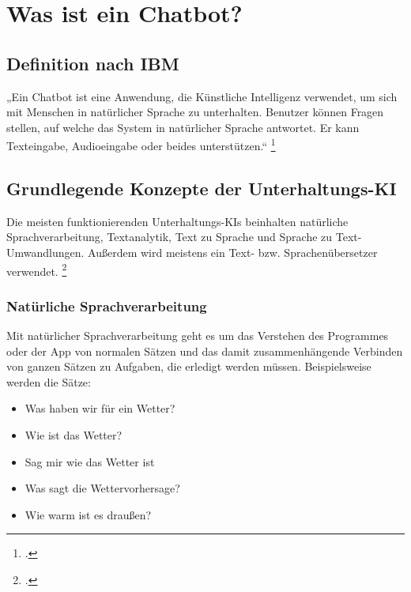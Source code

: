 \chapter{Was ist ein Chatbot?} %
\label{cha:Was ist ein Chatbot?}

\section{Definition nach IBM} %
\label{sec:Definition nach IBM}

„Ein Chatbot ist eine Anwendung, die Künstliche Intelligenz verwendet, um sich mit Menschen in natürlicher Sprache zu unterhalten. Benutzer können Fragen stellen, auf welche das System in natürlicher Sprache antwortet. Er kann Texteingabe, Audioeingabe oder beides unterstützen.“ \footcite[][]{.2021}


\section{Grundlegende Konzepte der Unterhaltungs-KI} %
\label{sec:Grundlegende Konzepte der Unterhaltungs-KI}

Die meisten funktionierenden Unterhaltungs-KIs beinhalten natürliche Sprachverarbeitung, Textanalytik, Text zu Sprache und Sprache zu Text-Umwandlungen. Außerdem wird meistens ein Text- bzw. Sprachenübersetzer verwendet. \footcite[][S. 2]{Bisser.2021}


\subsection{Natürliche Sprachverarbeitung} %
\label{sub:Natürliche Sprachverarbeitung}

Mit natürlicher Sprachverarbeitung geht es um das Verstehen des Programmes oder der App von normalen Sätzen und das damit zusammenhängende Verbinden von ganzen Sätzen zu Aufgaben, die erledigt werden müssen. Beispielsweise werden die Sätze:

\begin{itemize}
	\item \glqq Was haben wir für ein Wetter? \grqq
	\item \glqq Wie ist das Wetter? \grqq
	\item \glqq Sag mir wie das Wetter ist \grqq
	\item \glqq Was sagt die Wettervorhersage? \grqq
	\item \glqq Wie warm ist es draußen? \grqq
\end{itemize}

